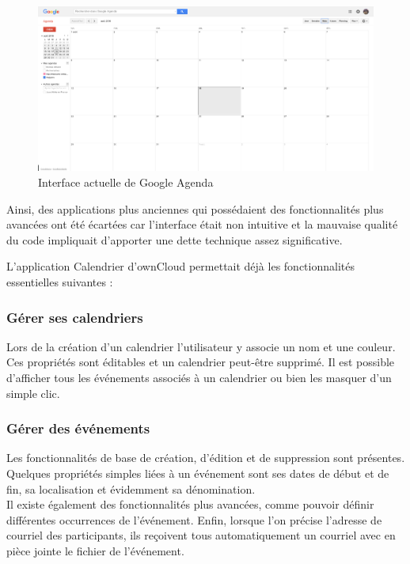 \documentclass[10pt,a4paper, twoside]{report}
\begin{document}
	\begin{figure}[ht]
		\centering
		\centerline{\includegraphics[width=1.5\textwidth]{images/google-agenda-interface-actuelle.png}}
		\caption*{Interface actuelle de Google Agenda}
		\label{normal_case}
	\end{figure}
	
	Ainsi, des applications plus anciennes qui possédaient des fonctionnalités plus avancées ont été écartées car l'interface était non intuitive et la mauvaise qualité du code impliquait d'apporter une dette technique assez significative.
	
	L'application Calendrier d'ownCloud permettait déjà les fonctionnalités essentielles suivantes :
	
	\subsubsection{Gérer ses calendriers}
	Lors de la création d'un calendrier l'utilisateur y associe un nom et une couleur. Ces propriétés sont éditables et un calendrier peut-être supprimé. Il est possible d'afficher tous les événements associés à un calendrier ou bien les masquer d'un simple clic.
	
	\subsubsection{Gérer des événements}
	Les fonctionnalités de base de création, d'édition et de suppression sont présentes. Quelques propriétés simples liées à un événement sont ses dates de début et de fin, sa localisation et évidemment sa dénomination.
	\\
	
	Il existe également des fonctionnalités plus avancées, comme pouvoir définir différentes occurrences de l'événement. Enfin, lorsque l'on précise l'adresse de courriel des participants, ils reçoivent tous automatiquement un courriel avec en pièce jointe le fichier de l'événement.
	
\end{document}
